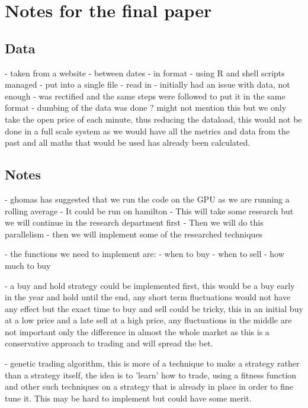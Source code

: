 \documentclass[conference]{IEEEtran}
\begin{document}
\iffalse
#################################################################################
\fi

\section*{Notes for the final paper}

\subsection*{Data}
- taken from a website
- between dates
- in format
- using R and shell scripts managed
- put into a single file
- read in
- initially had an issue with data, not enough
- was rectified and the same steps were followed to put it in the same format
- dumbing of the data was done ? might not mention this but we only take the open price of each minute, thus reducing the dataload, this would not be done in a full scale system as we would have all the metrics and data from the past and all maths that would be used has already been calculated.

\subsection*{Notes}
- ghomas has suggested that we run the code on the GPU as we are running a rolling average
- It could be run on hamilton
- This will take some research but we will continue in the research department first
- Then we will do this parallelism
- then we will implement some of the researched techniques

- the functions we need to implement are:
- when to buy
- when to sell
- how much to buy

- a buy and hold strategy could be implemented first, this would be a buy early in the year and hold until the end, any short term fluctuations would not have any effect but the exact time to buy and sell could be tricky, this in an initial buy at a low price and a late sell at a high price, any fluctuations in the middle are not important only the difference in almost the whole market as this is a conservative approach to trading and will spread the bet.

- genetic trading algorithm, this is more of a technique to make a strategy rather than a strategy itself, the idea is to 'learn' how to trade, using a fitness function and other such techniques on a strategy that is already in place in order to fine tune it. This may be hard to implement but could have some merit.
\end{document}

